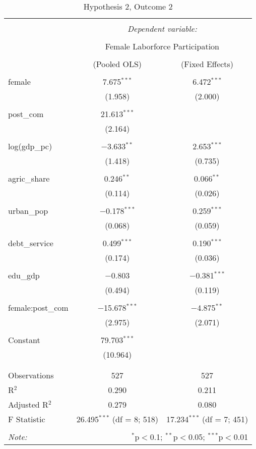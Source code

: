 \documentclass[12pt]{article}
\begin{document}
\begin{table}[!htbp] \centering 
  \caption{Hypothesis 2, Outcome 2} 
  \label{} 
\begin{tabular}{@{\extracolsep{5pt}}lcc} 
\\[-1.8ex]\hline 
\hline \\[-1.8ex] 
 & \multicolumn{2}{c}{\textit{Dependent variable:}} \\ 
\cline{2-3} 
\\[-1.8ex] & \multicolumn{2}{c}{Female Laborforce Participation} \\ 
\\[-1.8ex] & (Pooled OLS) & (Fixed Effects)\\ 
\hline \\[-1.8ex] 
 female & 7.675$^{***}$ & 6.472$^{***}$ \\ 
  & (1.958) & (2.000) \\ 
  & & \\ 
 post\_com & 21.613$^{***}$ &  \\ 
  & (2.164) &  \\ 
  & & \\ 
 log(gdp\_pc) & $-$3.633$^{**}$ & 2.653$^{***}$ \\ 
  & (1.418) & (0.735) \\ 
  & & \\ 
 agric\_share & 0.246$^{**}$ & 0.066$^{**}$ \\ 
  & (0.114) & (0.026) \\ 
  & & \\ 
 urban\_pop & $-$0.178$^{***}$ & 0.259$^{***}$ \\ 
  & (0.068) & (0.059) \\ 
  & & \\ 
 debt\_service & 0.499$^{***}$ & 0.190$^{***}$ \\ 
  & (0.174) & (0.036) \\ 
  & & \\ 
 edu\_gdp & $-$0.803 & $-$0.381$^{***}$ \\ 
  & (0.494) & (0.119) \\ 
  & & \\ 
 female:post\_com & $-$15.678$^{***}$ & $-$4.875$^{**}$ \\ 
  & (2.975) & (2.071) \\ 
  & & \\ 
 Constant & 79.703$^{***}$ &  \\ 
  & (10.964) &  \\ 
  & & \\ 
\hline \\[-1.8ex] 
Observations & 527 & 527 \\ 
R$^{2}$ & 0.290 & 0.211 \\ 
Adjusted R$^{2}$ & 0.279 & 0.080 \\ 
F Statistic & 26.495$^{***}$ (df = 8; 518) & 17.234$^{***}$ (df = 7; 451) \\ 
\hline 
\hline \\[-1.8ex] 
\textit{Note:}  & \multicolumn{2}{r}{$^{*}$p$<$0.1; $^{**}$p$<$0.05; $^{***}$p$<$0.01} \\ 
\end{tabular} 
\end{table} 
\end{document}
